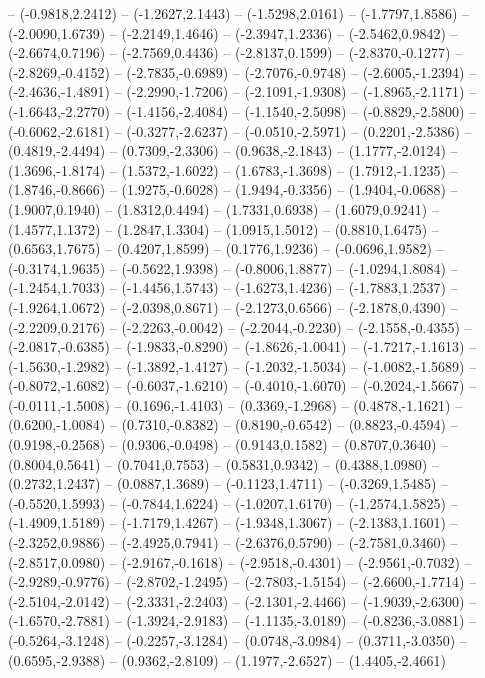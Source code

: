 {	-- (-0.9818,2.2412)
	-- (-1.2627,2.1443)
	-- (-1.5298,2.0161)
	-- (-1.7797,1.8586)
	-- (-2.0090,1.6739)
	-- (-2.2149,1.4646)
	-- (-2.3947,1.2336)
	-- (-2.5462,0.9842)
	-- (-2.6674,0.7196)
	-- (-2.7569,0.4436)
	-- (-2.8137,0.1599)
	-- (-2.8370,-0.1277)
	-- (-2.8269,-0.4152)
	-- (-2.7835,-0.6989)
	-- (-2.7076,-0.9748)
	-- (-2.6005,-1.2394)
	-- (-2.4636,-1.4891)
	-- (-2.2990,-1.7206)
	-- (-2.1091,-1.9308)
	-- (-1.8965,-2.1171)
	-- (-1.6643,-2.2770)
	-- (-1.4156,-2.4084)
	-- (-1.1540,-2.5098)
	-- (-0.8829,-2.5800)
	-- (-0.6062,-2.6181)
	-- (-0.3277,-2.6237)
	-- (-0.0510,-2.5971)
	-- (0.2201,-2.5386)
	-- (0.4819,-2.4494)
	-- (0.7309,-2.3306)
	-- (0.9638,-2.1843)
	-- (1.1777,-2.0124)
	-- (1.3696,-1.8174)
	-- (1.5372,-1.6022)
	-- (1.6783,-1.3698)
	-- (1.7912,-1.1235)
	-- (1.8746,-0.8666)
	-- (1.9275,-0.6028)
	-- (1.9494,-0.3356)
	-- (1.9404,-0.0688)
	-- (1.9007,0.1940)
	-- (1.8312,0.4494)
	-- (1.7331,0.6938)
	-- (1.6079,0.9241)
	-- (1.4577,1.1372)
	-- (1.2847,1.3304)
	-- (1.0915,1.5012)
	-- (0.8810,1.6475)
	-- (0.6563,1.7675)
	-- (0.4207,1.8599)
	-- (0.1776,1.9236)
	-- (-0.0696,1.9582)
	-- (-0.3174,1.9635)
	-- (-0.5622,1.9398)
	-- (-0.8006,1.8877)
	-- (-1.0294,1.8084)
	-- (-1.2454,1.7033)
	-- (-1.4456,1.5743)
	-- (-1.6273,1.4236)
	-- (-1.7883,1.2537)
	-- (-1.9264,1.0672)
	-- (-2.0398,0.8671)
	-- (-2.1273,0.6566)
	-- (-2.1878,0.4390)
	-- (-2.2209,0.2176)
	-- (-2.2263,-0.0042)
	-- (-2.2044,-0.2230)
	-- (-2.1558,-0.4355)
	-- (-2.0817,-0.6385)
	-- (-1.9833,-0.8290)
	-- (-1.8626,-1.0041)
	-- (-1.7217,-1.1613)
	-- (-1.5630,-1.2982)
	-- (-1.3892,-1.4127)
	-- (-1.2032,-1.5034)
	-- (-1.0082,-1.5689)
	-- (-0.8072,-1.6082)
	-- (-0.6037,-1.6210)
	-- (-0.4010,-1.6070)
	-- (-0.2024,-1.5667)
	-- (-0.0111,-1.5008)
	-- (0.1696,-1.4103)
	-- (0.3369,-1.2968)
	-- (0.4878,-1.1621)
	-- (0.6200,-1.0084)
	-- (0.7310,-0.8382)
	-- (0.8190,-0.6542)
	-- (0.8823,-0.4594)
	-- (0.9198,-0.2568)
	-- (0.9306,-0.0498)
	-- (0.9143,0.1582)
	-- (0.8707,0.3640)
	-- (0.8004,0.5641)
	-- (0.7041,0.7553)
	-- (0.5831,0.9342)
	-- (0.4388,1.0980)
	-- (0.2732,1.2437)
	-- (0.0887,1.3689)
	-- (-0.1123,1.4711)
	-- (-0.3269,1.5485)
	-- (-0.5520,1.5993)
	-- (-0.7844,1.6224)
	-- (-1.0207,1.6170)
	-- (-1.2574,1.5825)
	-- (-1.4909,1.5189)
	-- (-1.7179,1.4267)
	-- (-1.9348,1.3067)
	-- (-2.1383,1.1601)
	-- (-2.3252,0.9886)
	-- (-2.4925,0.7941)
	-- (-2.6376,0.5790)
	-- (-2.7581,0.3460)
	-- (-2.8517,0.0980)
	-- (-2.9167,-0.1618)
	-- (-2.9518,-0.4301)
	-- (-2.9561,-0.7032)
	-- (-2.9289,-0.9776)
	-- (-2.8702,-1.2495)
	-- (-2.7803,-1.5154)
	-- (-2.6600,-1.7714)
	-- (-2.5104,-2.0142)
	-- (-2.3331,-2.2403)
	-- (-2.1301,-2.4466)
	-- (-1.9039,-2.6300)
	-- (-1.6570,-2.7881)
	-- (-1.3924,-2.9183)
	-- (-1.1135,-3.0189)
	-- (-0.8236,-3.0881)
	-- (-0.5264,-3.1248)
	-- (-0.2257,-3.1284)
	-- (0.0748,-3.0984)
	-- (0.3711,-3.0350)
	-- (0.6595,-2.9388)
	-- (0.9362,-2.8109)
	-- (1.1977,-2.6527)
	-- (1.4405,-2.4661)
}
